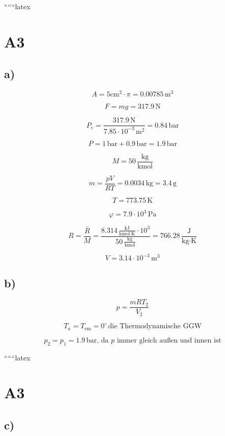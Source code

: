 
``````latex


\section*{A3}

\subsection*{a)}

\[
A = 5 \text{cm}^2 \cdot \pi = 0.00785 \, \text{m}^3
\]

\[
F = mg = 317.9 \, \text{N}
\]

\[
P_e = \frac{317.9 \, \text{N}}{7.85 \cdot 10^{-3} \, \text{m}^2} = 0.84 \, \text{bar}
\]

\[
P = 1 \, \text{bar} + 0.9 \, \text{bar} = 1.9 \, \text{bar}
\]

\[
M = 50 \, \frac{\text{kg}}{\text{kmol}}
\]

\[
m = \frac{pV}{RT} = 0.0034 \, \text{kg} = 3.4 \, \text{g}
\]

\[
T = 773.75 \, \text{K}
\]

\[
\varphi = 7.9 \cdot 10^3 \, \text{Pa}
\]

\[
R = \frac{\bar{R}}{M} = \frac{8.314 \, \frac{\text{kJ}}{\text{kmol} \cdot \text{K}} \cdot 10^3}{50 \, \frac{\text{kg}}{\text{kmol}}} = 766.28 \, \frac{\text{J}}{\text{kg} \cdot \text{K}}
\]

\[
V = 3.14 \cdot 10^{-3} \, \text{m}^3
\]

\subsection*{b)}

\[
p = \frac{mRT_2}{V_2}
\]

\[
T_a = T_{\text{em}} = 0^\circ \, \text{die Thermodynamische GGW}
\]

\[
p_2 = p_1 = 1.9 \, \text{bar}, \, \text{da } p \text{ immer gleich außen und innen ist}
\]

``````latex


\section*{A3}

\subsection*{c)}

